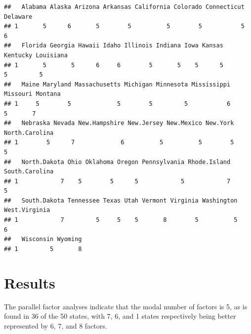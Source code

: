 \documentclass[
  english,
  man]{apa6}
\begin{document}
\begin{verbatim}
##   Alabama Alaska Arizona Arkansas California Colorado Connecticut Delaware
## 1       5      6       5        5          5        5           5        6
##   Florida Georgia Hawaii Idaho Illinois Indiana Iowa Kansas Kentucky Louisiana
## 1       5       5      6     6        5       5    5      5        5         5
##   Maine Maryland Massachusetts Michigan Minnesota Mississippi Missouri Montana
## 1     5        5             5        5         5           6        5       7
##   Nebraska Nevada New.Hampshire New.Jersey New.Mexico New.York North.Carolina
## 1        5      7             6          5          5        5              5
##   North.Dakota Ohio Oklahoma Oregon Pennsylvania Rhode.Island South.Carolina
## 1            7    5        5      5            5            7              5
##   South.Dakota Tennessee Texas Utah Vermont Virginia Washington West.Virginia
## 1            7         5     5    5       8        5          5             6
##   Wisconsin Wyoming
## 1         5       8
\end{verbatim}

\hypertarget{results}{%
\section{Results}\label{results}}

The parallel factor analyses indicate that the modal number of factors is 5, as is found in 36 of the 50 states, with 7, 6, and 1 states respectively being better represented by 6, 7, and 8 factors.
\end{document}
